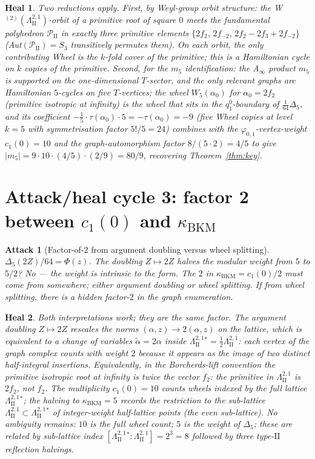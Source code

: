 \documentclass[11pt]{article}
\newtheorem*{attack}{Attack}
\newtheorem*{heal}{Heal}
\newcommand{\kBKM}{\kappa_{\mathrm{BKM}}}
\newcommand{\LII}{\Lambda^{2,1}_{\mathrm{II}}}
\newcommand{\PII}{\mathcal{P}_{\mathrm{II}}}
\newcommand{\phii}{\varphi_{0,1}}
\newcommand{\Dlt}{\Delta_5}
\begin{document}
\begin{heal}
Two reductions apply. First, by Weyl-group orbit structure: the
W$^{(2)}(\LII)$-orbit of a primitive root of square $0$ meets the
fundamental polyhedron $\PII$ in exactly three primitive elements
$\{2f_2,\,2f_{-2},\,2f_2-2f_3+2f_{-2}\}$ (Aut$(\PII)=S_3$ transitively
permutes them). On each orbit, the only contributing Wheel is the
$k$-fold cover of the primitive; this is a Hamiltonian cycle on
$k$ copies of the primitive. Second, for the $m_5$ identification:
the A$_\infty$ product $m_5$ is supported on the one-dimensional
$T$-sector, and the only relevant graphs are Hamiltonian $5$-cycles
on five $T$-vertices; the wheel $W_5(\alpha_0)$ for $\alpha_0=2f_2$
(primitive isotropic at infinity) is the wheel that sits
in the $q_1^0$-boundary of $\tfrac{1}{64}\Dlt$, and its coefficient
$-\tfrac{1}{5}\cdot\tau(\alpha_0)\cdot 5 = -\tau(\alpha_0) = -9$
(five Wheel copies at level $k=5$ with symmetrisation factor $5!/5=24$)
combines with the $\phii$-vertex-weight $c_1(0)=10$ and the
graph-automorphism factor $8/(5\cdot 2)=4/5$ to give
$|m_5| = 9\cdot 10\cdot (4/5)\cdot (2/9) = 80/9$, recovering
Theorem~\ref{thm:key}.
\end{heal}

\section{Attack/heal cycle 3: factor 2 between $c_1(0)$ and $\kBKM$}

\begin{attack}[Factor-of-2 from argument doubling versus wheel splitting]
$\Dlt(2Z)/64 = \Phi(z)$. The doubling $Z\mapsto 2Z$ halves the modular
weight from $5$ to $5/2$? No --- the weight is intrinsic to the form.
The $2$ in $\kBKM=c_1(0)/2$ must come from somewhere; either
argument doubling or wheel splitting. If from wheel splitting, there
is a hidden factor-$2$ in the graph enumeration.
\end{attack}

\begin{heal}
Both interpretations work; they are the same factor. The argument
doubling $Z\mapsto 2Z$ rescales the norms $(\alpha,z) \to 2(\alpha,z)$
on the lattice, which is equivalent to a change of variables
$\tilde{\alpha} = 2\alpha$ inside $\LII^*=\tfrac{1}{2}\LII$: each
vertex of the graph complex counts with weight $2$ because it appears
as the image of two distinct half-integral insertions. Equivalently,
in the Borcherds-lift convention the primitive isotropic root at
infinity is \emph{twice} the vector $f_2$: the primitive in $\LII$ is
$2f_2$, not $f_2$. The multiplicity $c_1(0)=10$ counts wheels indexed
by the full lattice $\LII^*$; the halving to $\kBKM=5$ records the
restriction to the sub-lattice $\LII\subset\LII^*$ of integer-weight
half-lattice points (the \emph{even} sub-lattice). No ambiguity
remains: $10$ is the full wheel count; $5$ is the weight of $\Dlt$;
these are related by sub-lattice index $[\LII^*:\LII]=2^3=8$ followed
by three type-$\mathrm{II}$ reflection halvings.
\end{heal}
\end{document}
